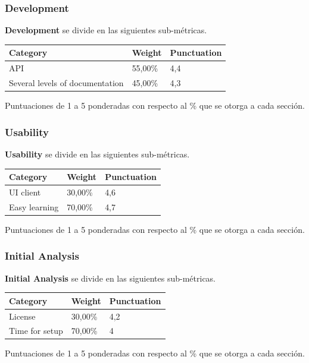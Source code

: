 \documentclass[xcolor=dvipsnames]{beamer}
\begin{document}
\begin{frame}[allowframebreaks]
\frametitle{Development}

\par \textbf{Development} se divide en las siguientes sub-m\'etricas.

\begin{tabular}{|l|l|l|}
    \hline {\bf Category} & {\bf Weight} & {\bf Punctuation}\\
    \hline API	 & 55,00\% & 4,4\\
    \hline Several levels of documentation & 45,00\% & 4,3\\
    \hline
\end{tabular}

Puntuaciones de 1 a 5 ponderadas con respecto al \% que se otorga a cada secci\'on.

\end{frame}

\begin{frame}[allowframebreaks]
\frametitle{Usability}

\par \textbf{Usability} se divide en las siguientes sub-m\'etricas.

\begin{tabular}{|l|l|l|}
    \hline {\bf Category} & {\bf Weight} & {\bf Punctuation}\\
    \hline UI client	 & 30,00\% & 4,6\\
    \hline Easy learning & 70,00\% & 4,7\\
    \hline
\end{tabular}

Puntuaciones de 1 a 5 ponderadas con respecto al \% que se otorga a cada secci\'on.

\end{frame}

\begin{frame}[allowframebreaks]
\frametitle{Initial Analysis}

\par \textbf{Initial Analysis} se divide en las siguientes sub-m\'etricas.

\begin{tabular}{|l|l|l|}
    \hline {\bf Category} & {\bf Weight} & {\bf Punctuation}\\
    \hline License	 & 30,00\% & 4,2\\
    \hline Time for setup & 70,00\% & 4\\
    \hline
\end{tabular}

Puntuaciones de 1 a 5 ponderadas con respecto al \% que se otorga a cada secci\'on.

\end{frame}
\end{document}
